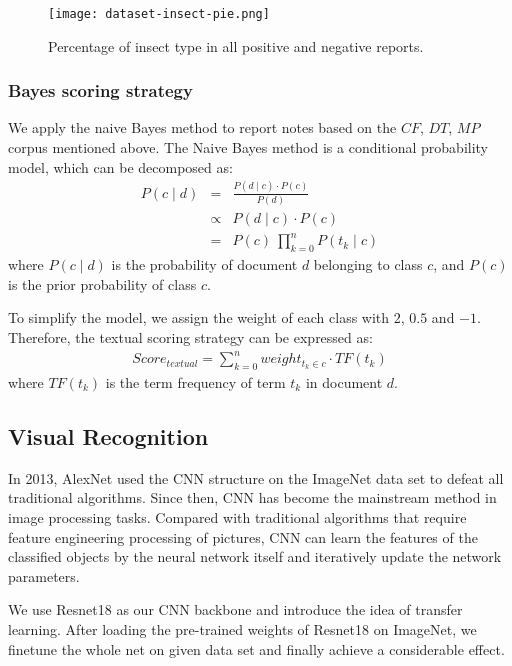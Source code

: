 \documentclass{mcmthesis}
\begin{document}
\begin{figure}[htbp]
    \centering
    \texttt{[image: dataset-insect-pie.png]}
    \caption{Percentage of insect type in all positive and negative reports.}
    \label{fig:dataset-insect-pie}
\end{figure}


\subsubsection{Bayes scoring strategy}

We apply the naive Bayes\cite{naivebayes} method to report notes based on the $CF$, $DT$, $MP$ corpus mentioned above. The Naive Bayes method is a conditional probability model, which  can be decomposed as:
\begin{eqnarray}
P(c \mid d) &=& \frac{P(d \mid c) \cdot P(c)}{P(d)} \nonumber\\
&\propto& P(d \mid c) \cdot P(c) \nonumber\\
&=& P(c) \ \prod_{k=0}^{n} P(t_k \mid c)
\end{eqnarray}
where $P(c \mid d)$ is the probability of document $d$ belonging to class $c$, and $P(c)$ is the prior probability of class $c$.

To simplify the model, we assign the weight of each class with $2$, $0.5$ and $-1$. Therefore, the textual scoring strategy can be expressed as:
\begin{eqnarray}
Score_{textual} = \sum_{k=0}^{n}weight_{t_k \in c} \cdot TF(t_k)
\end{eqnarray}
where $TF(t_k)$ is the term frequency of term $t_k$ in document $d$.


\subsection{Visual Recognition}
In 2013, AlexNet\cite{alexnet} used the CNN structure on the ImageNet\cite{imagenet_cvpr09} data set to defeat all traditional algorithms. Since then, CNN has become the mainstream method in image processing tasks. Compared with traditional algorithms that require feature engineering processing of pictures, CNN can learn the features of the classified objects by the neural network itself and iteratively update the network parameters.

We use Resnet18\cite{resnet} as our CNN backbone and introduce the idea of transfer learning\cite{transferlearning}. After loading the pre-trained weights of Resnet18 on ImageNet, we finetune the whole net on given data set and finally achieve a considerable effect.
\end{document}
